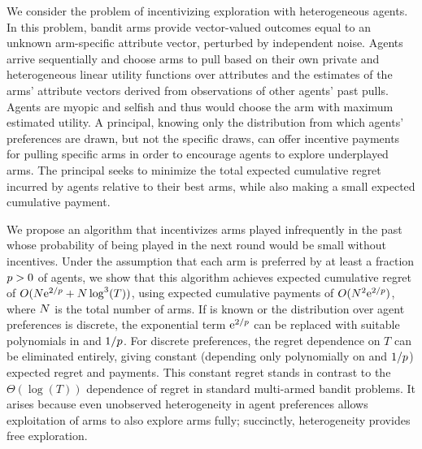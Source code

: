 We consider the problem of incentivizing exploration with heterogeneous agents.
In this problem, \dkedit{\ARMNUM} bandit arms provide vector-valued outcomes equal to an unknown
arm-specific attribute vector,
perturbed by independent noise.
Agents arrive sequentially and choose arms to pull based on their own
private and heterogeneous linear utility functions over attributes
and the estimates of the arms' attribute vectors derived from
observations of other agents' past pulls.
Agents are myopic and selfish and thus would choose the arm with
maximum estimated utility.
A principal, knowing only the distribution from which agents'
preferences are drawn, but not the specific draws,
can offer incentive payments for pulling specific arms
in order to encourage agents to explore underplayed arms.
The principal seeks to minimize the total expected cumulative regret
incurred by agents relative to their best arms,
while also making a small expected cumulative payment.

We propose an algorithm that incentivizes arms played infrequently in the
past whose probability of being played in the next round would be small
without incentives.
Under the assumption that each arm is preferred by at
least a fraction $p > 0$ of agents,
we show that this algorithm achieves expected
cumulative regret of $O (N \mathrm{e}^{2/p} + N \log^3(T))$,
using expected cumulative payments of $O(N^2 \mathrm{e}^{2/p})$, where $N$ is the total number of arms.
If \MinProb is known or the distribution over agent
preferences is discrete,
the exponential term $\mathrm{e}^{2/p}$ can be replaced with suitable
polynomials in \ARMNUM and $1/p$.
For discrete preferences, the regret dependence on $T$ can be
eliminated entirely, giving constant (depending only polynomially on
\ARMNUM and $1/p$) expected regret and payments.
This constant regret stands in contrast to the $\Theta(\log(T))$ dependence of
regret in standard multi-armed bandit problems.
It arises because even unobserved heterogeneity in agent preferences
allows exploitation of arms to also explore arms fully;
succinctly, heterogeneity provides free exploration.
